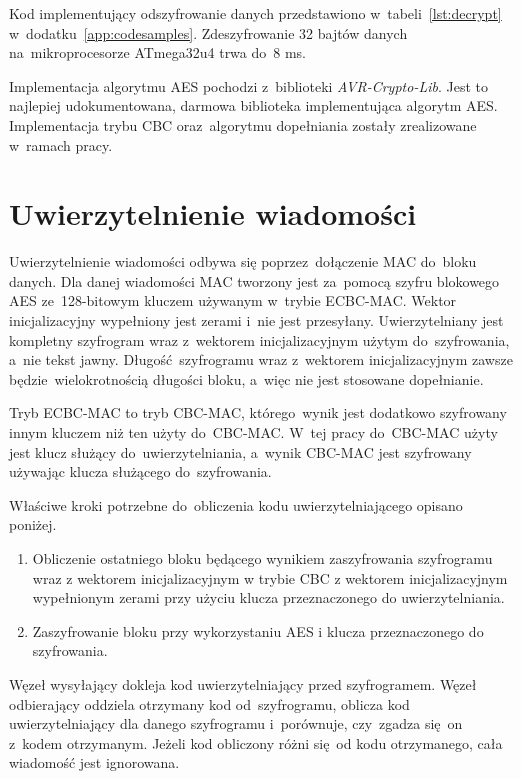 Kod implementujący odszyfrowanie danych przedstawiono w~tabeli~\ref{lst:decrypt} w~dodatku~\ref{app:codesamples}. Zdeszyfrowanie 32 bajtów danych na~mikroprocesorze ATmega32u4 trwa do~8 ms.

Implementacja algorytmu AES pochodzi z~biblioteki \emph{AVR-Crypto-Lib}. Jest to najlepiej udokumentowana, darmowa biblioteka implementująca algorytm AES. Implementacja trybu CBC oraz~algorytmu dopełniania zostały zrealizowane w~ramach pracy.

\section{Uwierzytelnienie wiadomości}
\label{sec:auth}


Uwierzytelnienie wiadomości odbywa się poprzez~dołączenie MAC do~bloku danych. Dla danej wiadomości MAC tworzony jest za~pomocą szyfru blokowego AES ze~128-bitowym kluczem używanym w~trybie ECBC-MAC. Wektor inicjalizacyjny wypełniony jest zerami i~nie jest przesyłany. Uwierzytelniany jest kompletny szyfrogram wraz z~wektorem inicjalizacyjnym użytym do~szyfrowania, a~nie tekst jawny. Długość szyfrogramu wraz z~wektorem inicjalizacyjnym zawsze będzie wielokrotnością długości bloku, a~więc nie jest stosowane dopełnianie.

Tryb ECBC-MAC to tryb CBC-MAC, którego~wynik jest dodatkowo szyfrowany innym kluczem niż ten użyty do~CBC-MAC. W~tej pracy do~CBC-MAC użyty jest klucz służący do~uwierzytelniania, a~wynik CBC-MAC jest szyfrowany używając klucza służącego do~szyfrowania.

Właściwe kroki potrzebne do~obliczenia kodu uwierzytelniającego opisano poniżej.

\begin{enumerate}
\item Obliczenie ostatniego bloku będącego wynikiem zaszyfrowania szyfrogramu wraz z wektorem inicjalizacyjnym w trybie CBC z wektorem inicjalizacyjnym wypełnionym zerami przy użyciu klucza przeznaczonego do uwierzytelniania.
\item Zaszyfrowanie bloku przy wykorzystaniu AES i klucza przeznaczonego do szyfrowania.
\end{enumerate}

Węzeł wysyłający dokleja kod uwierzytelniający przed szyfrogramem. Węzeł odbierający oddziela otrzymany kod od~szyfrogramu, oblicza kod uwierzytelniający dla danego szyfrogramu i~porównuje, czy~zgadza się on z~kodem otrzymanym. Jeżeli kod obliczony różni się od kodu otrzymanego, cała wiadomość jest ignorowana.

